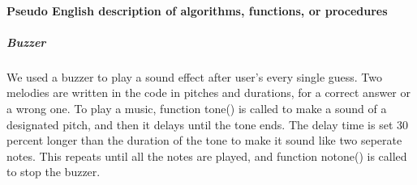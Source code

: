 \paragraph{Pseudo English description of algorithms, functions, or procedures}

\subparagraph{Buzzer}
\hfill \newline
We used a buzzer to play a sound effect after user's every single guess. Two melodies are written in the code in pitches and durations, for a correct answer or a wrong one. To play a music, function tone() is called to make a sound of a designated pitch, and then it delays until the tone ends. The delay time is set 30 percent longer than the duration of the tone to make it sound like two seperate notes. This repeats until all the notes are played, and function notone() is called to stop the buzzer.

